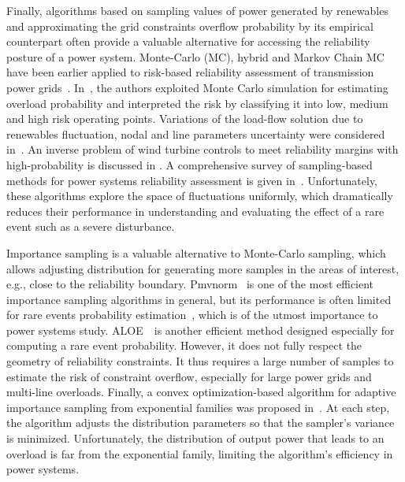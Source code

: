 Finally, algorithms based on sampling values of power generated by renewables and approximating the grid constraints overflow probability by its empirical counterpart often provide a valuable alternative for accessing the reliability posture of a power system. Monte-Carlo (MC), hybrid and Markov Chain MC have been earlier applied to risk-based reliability assessment of transmission power grids~\cite{su2005probabilistic,vittal2009steady,chen2008probabilistic}. 
In~\cite{montecarlofeasibility}, the authors exploited Monte Carlo simulation for estimating overload probability and interpreted the risk by classifying it into low, medium and high risk operating points. Variations of the load-flow solution due to renewables fluctuation, nodal and line parameters uncertainty were considered in~\cite{su2005probabilistic}.  An inverse problem of wind turbine controls to meet reliability margins with high-probability is discussed in \cite{vittal2009steady}.  A comprehensive survey of sampling-based methods for power systems reliability assessment is given in~\cite{chen2008probabilistic}.
Unfortunately, these algorithms explore the space of fluctuations uniformly, which dramatically 
reduces their performance in understanding and evaluating the effect of a rare event such as a severe disturbance. 

Importance sampling is a valuable alternative to Monte-Carlo sampling, which allows adjusting distribution for generating more samples in the areas of interest, e.g., close to the reliability boundary. Pmvnorm~\cite{genz2020package} is one of the most efficient importance sampling algorithms in general, but its performance is often limited for rare events probability estimation~\cite{owen2019importance}, which is of the utmost importance to power systems study.  ALOE~\cite{owen2019importance}~is another efficient method designed especially for computing a rare event probability. However, it does not fully respect the geometry of reliability constraints. 
It thus requires a large number of samples to estimate the risk of constraint overflow, especially for large power grids and multi-line overloads. Finally, a convex optimization-based algorithm for adaptive importance sampling from exponential families was proposed in~\cite{ryu2014adaptive}. At each step, the algorithm adjusts the distribution parameters so that the sampler's variance is minimized. Unfortunately, the distribution of output power that leads to an overload is far from the exponential family,  limiting the algorithm's efficiency in power systems.

